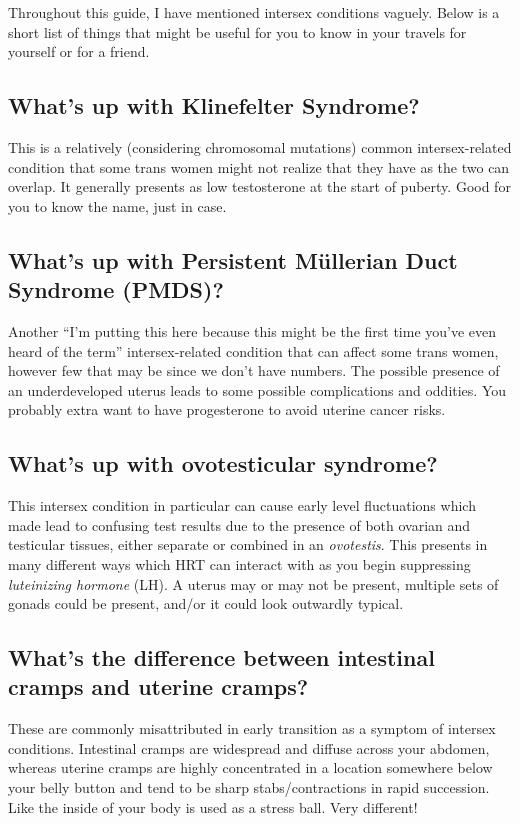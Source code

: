 \documentclass{article}
\begin{document}
Throughout this guide, I have mentioned intersex conditions vaguely. Below is a short list of things that might be useful for you to know in your travels for yourself or for a friend. 

\subsection{What’s up with Klinefelter Syndrome?}

This is a relatively (considering chromosomal mutations) common intersex-related condition that some trans women might not realize that they have as the two can overlap. It generally presents as low testosterone at the start of puberty. Good for you to know the name, just in case.

\subsection{What’s up with Persistent Müllerian Duct Syndrome (PMDS)?}

Another “I’m putting this here because this might be the first time you’ve even heard of the term” intersex-related condition that can affect some trans women, however few that may be since we don’t have numbers. The possible presence of an underdeveloped uterus leads to some possible complications and oddities. You probably extra want to have progesterone to avoid uterine cancer risks.

\subsection{What's up with ovotesticular syndrome?}

This intersex condition in particular can cause early level fluctuations which made lead to confusing test results due to the presence of both ovarian and testicular tissues, either separate or combined in an \textit{ovotestis}. This presents in many different ways which HRT can interact with as you begin suppressing \textit{luteinizing hormone} (LH). A uterus may or may not be present, multiple sets of gonads could be present, and/or it could look outwardly typical.

\subsection{What’s the difference between intestinal cramps and uterine cramps?}\label{11-35}

These are commonly misattributed in early transition as a symptom of intersex conditions. Intestinal cramps are widespread and diffuse across your abdomen, whereas uterine cramps are highly concentrated in a location somewhere below your belly button and tend to be sharp stabs/contractions in rapid succession. Like the inside of your body is used as a stress ball. Very different!
\end{document}

